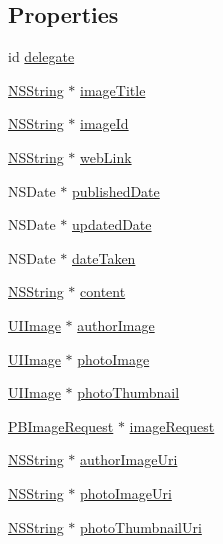 \subsection*{Properties}
\begin{DoxyCompactItemize}
\item 
id \hyperlink{interface_p_b_image_a8d9332fcd23523b1e2520b8765577423}{delegate}
\item 
\hyperlink{class_n_s_string}{NSString} $\ast$ \hyperlink{interface_p_b_image_ab2b75fc62ad2bd0851e3dbc23970e861}{imageTitle}
\item 
\hyperlink{class_n_s_string}{NSString} $\ast$ \hyperlink{interface_p_b_image_aa261fc22d796a74fe41c14b28e08b30b}{imageId}
\item 
\hyperlink{class_n_s_string}{NSString} $\ast$ \hyperlink{interface_p_b_image_ad8ac8644eb2e6a0a2b963a0242235562}{webLink}
\item 
NSDate $\ast$ \hyperlink{interface_p_b_image_a7c9e348da15c9c34c347bcc1bafd6fa2}{publishedDate}
\item 
NSDate $\ast$ \hyperlink{interface_p_b_image_ad3d43ed4d30cf7a94aea5bd5ae7e0671}{updatedDate}
\item 
NSDate $\ast$ \hyperlink{interface_p_b_image_aec17cd0d68172718dfac2208e2f104cd}{dateTaken}
\item 
\hyperlink{class_n_s_string}{NSString} $\ast$ \hyperlink{interface_p_b_image_a8442f36d5bc844633edba74b62ce2990}{content}
\item 
\hyperlink{class_u_i_image}{UIImage} $\ast$ \hyperlink{interface_p_b_image_a71aa8412f076c05a16d5244586dc7955}{authorImage}
\item 
\hyperlink{class_u_i_image}{UIImage} $\ast$ \hyperlink{interface_p_b_image_acc01abe6ae58d15eb68d6f8982922eb0}{photoImage}
\item 
\hyperlink{class_u_i_image}{UIImage} $\ast$ \hyperlink{interface_p_b_image_a246f847f78ea171cf4cce2e6dda32725}{photoThumbnail}
\item 
\hyperlink{interface_p_b_image_request}{PBImageRequest} $\ast$ \hyperlink{interface_p_b_image_ae1353071f99808617f8d3726ebc0db95}{imageRequest}
\item 
\hyperlink{class_n_s_string}{NSString} $\ast$ \hyperlink{interface_p_b_image_ad3d1904f67220f320f88ad5b6a9714ef}{authorImageUri}
\item 
\hyperlink{class_n_s_string}{NSString} $\ast$ \hyperlink{interface_p_b_image_afd02dd84e4335a88dfb40fa243268f85}{photoImageUri}
\item 
\hyperlink{class_n_s_string}{NSString} $\ast$ \hyperlink{interface_p_b_image_a68ff9e3c26d377921ce02942d15f7fbb}{photoThumbnailUri}
\end{DoxyCompactItemize}


